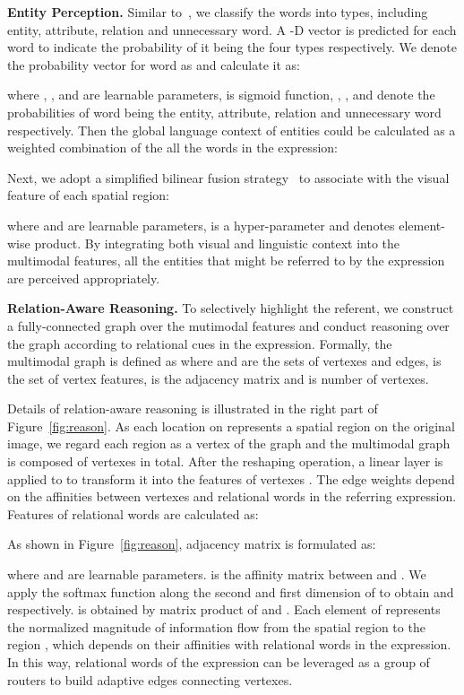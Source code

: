 \documentclass[10pt,twocolumn,letterpaper]{article}
\begin{document}
\textbf{Entity Perception. }Similar to~\cite{yang2019cross}, we classify the words into  types, including entity, attribute, relation and unnecessary word. 
A -D vector is predicted for each word to indicate the probability of it being the four types respectively.
We denote the probability vector for word  as  and calculate it as:

where , ,  and  are learnable parameters,  is sigmoid function, 
, ,  and  denote the probabilities of word  being the entity, attribute, relation and unnecessary word respectively. 
Then the global language context of entities  could be calculated as a weighted combination of the all the words in the expression:


Next, we adopt a simplified bilinear fusion strategy~\cite{BenMUTAN} to associate  with the visual feature of each spatial region:


where  and  are learnable parameters,  is a hyper-parameter and  denotes element-wise product.
By integrating both visual and linguistic context into the multimodal features, all the entities that might be referred to by the expression are perceived appropriately.

\textbf{Relation-Aware Reasoning. }To selectively highlight the referent, we construct a fully-connected graph over the mutimodal features  and conduct reasoning over the graph according to relational cues in the expression.
Formally, the multimodal graph is defined as  where  and  are the sets of vertexes and edges,  is the set of vertex features,  is the adjacency matrix and  is number of vertexes.

Details of relation-aware reasoning is illustrated in the right part of Figure~\ref{fig:reason}.
As each location on  represents a spatial region on the original image, we regard each region as a vertex of the graph and the multimodal graph is composed of  vertexes in total.
After the reshaping operation, a linear layer is applied to  to transform it into the features of vertexes . 
The edge weights depend on the affinities between vertexes and relational words in the referring expression. 
Features of relational words  are calculated as:

As shown in Figure~\ref{fig:reason}, adjacency matrix  is formulated as:




where  and  are learnable parameters.  is the affinity matrix between  and . We apply the softmax function along the second and first dimension of  to obtain  and  respectively.
 is obtained by matrix product of  and .
Each element  of  represents the normalized magnitude of information flow from the spatial region  to the region , which depends on their affinities with relational words in the expression.
In this way, relational words of the expression can be leveraged as a group of routers to build adaptive edges connecting vertexes.
\end{document}
